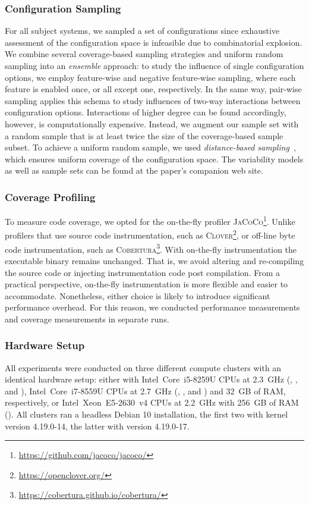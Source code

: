 \subsubsection{Configuration Sampling}
For all subject systems, we sampled a set of configurations since exhaustive assessment of the configuration space is infeasible due to combinatorial explosion. We combine several coverage-based sampling strategies and uniform random sampling into an \emph{ensemble} approach: to study the influence of single configuration options, we employ feature-wise and negative feature-wise sampling, where each feature is enabled once, or all except one, respectively. In the same way, pair-wise sampling applies this schema to study influences of two-way interactions between configuration options. Interactions of higher degree can be found accordingly, however, is computationally expensive. Instead, we augment our sample set with a random sample that is at least twice the size of the coverage-based sample subset. To achieve a uniform random sample, we used \emph{distance-based sampling}~\cite{kaltenecker_distance-based_2019}, which ensures uniform coverage of the configuration space. The variability models as well as sample sets can be found at the paper's companion web site.

\subsubsection{Coverage Profiling}\label{sec:profiling}
To measure code coverage, we opted for the on-the-fly profiler \textsc{JaCoCo}\footnote{\url{https://github.com/jacoco/jacoco/}}. Unlike profilers that use source code instrumentation, such as \textsc{Clover}\footnote{\url{https://openclover.org/}}, or off-line byte code instrumentation, such as \textsc{Cobertura}\footnote{\url{https://cobertura.github.io/cobertura/}}. With on-the-fly instrumentation the executable binary remains unchanged. That is, we avoid altering and re-compiling the source code or injecting instrumentation code post compilation. From a practical perspective, on-the-fly instrumentation is more flexible and easier to accommodate. Nonetheless, either choice is likely to introduce significant performance overhead. For this reason, we conducted performance measurements and coverage measurements in separate runs.

\subsubsection{Hardware Setup}
All experiments were conducted on three different compute clusters with an identical hardware setup: either with Intel~Core~i5-8259U CPUs at 2.3~GHz (\jumper, \kanzi, and \hsqldb),  Intel~Core~i7-8559U CPUs at 2.7~GHz (\dconvert, \batik, and \jadx) and 32~GB of RAM, respectively, or Intel~Xeon~E5-2630~v4 CPUs at 2.2~GHz with 256~GB of RAM (\htwo). All clusters ran a headless Debian 10 installation, the first two with kernel version \mbox{4.19.0-14}, the latter with version \mbox{4.19.0-17}. 


